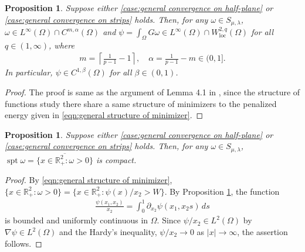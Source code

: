 \documentclass[11pt,letterpaper]{amsart}
\newtheorem{prop}[thm]{Proposition}
\theoremstyle{definition}
\theoremstyle{remark}
\renewcommand{\S}{\mathcal{S}}
\newcommand{\R}{\mathbb{R}}
\renewcommand{\O}{\Omega}
\newcommand{\spt}{\operatorname{spt}}
\numberwithin{equation}{section}
\begin{document}
\begin{prop}\label{prop:regularity study}
    Suppose either \ref{case:general convergence on half-plane} or \ref{case:general convergence on strips} holds.
    Then, for any $\omega \in S_{\mu,\lambda}$, $\omega \in L^\infty(\O)\cap C^{m,\alpha}(\O)$ and $\psi = \int_{\O}G\omega \in L^\infty(\O) \cap W^{2,q}_{\mathrm{loc}}(\O)$ for all $q \in (1, \infty)$, where 
    \begin{align}
        m = \left\lceil \frac{1}{p-1} - 1 \right\rceil, \quad \alpha = \frac{1}{p-1} - m \in (0, 1]. \label{eqn:regularity of minimizers}
    \end{align}
    In particular, $\psi \in C^{1,\beta}(\O)$ for all $\beta \in (0, 1)$.
\end{prop}
\begin{proof}
    The proof is same as the argument of Lemma 4.1 in \cite{abe2025existence}, since the structure of functions study there share a same structure of minimizers to the penalized energy given in \eqref{eqn:general structure of minimizer}.
    
\end{proof}

\begin{prop}\label{prop:compactly support of minimizer}
    Suppose either \ref{case:general convergence on half-plane} or \ref{case:general convergence on strips} holds. Then, for any $\omega \in S_{\mu,\lambda}$,  $\spt \omega = \overline{\{x \in \mathbb{R}^2_+ : \omega > 0\}}$ is compact.
\end{prop}
\begin{proof}
    By \eqref{eqn:general structure of minimizer}, $\{x \in \mathbb{R}^2_+ : \omega > 0\} = \{x \in \mathbb{R}^2_+ : \psi(x)/x_2 > W \}$. By Proposition \ref{prop:regularity study}, the function 
    \begin{align*}
        \frac{\psi(x_1, x_2)}{x_2} = \int_0^1 \partial_{x_2} \psi(x_1, x_2 s)\,ds
    \end{align*}
    is bounded and uniformly continuous in $\O$. Since $\psi/x_2 \in L^2(\O)$ by $\nabla \psi \in L^2(\O)$ and the Hardy's inequality, $\psi/x_2 \to 0$ as $|x| \to \infty$, the assertion follows.
    
\end{proof}
\end{document}
